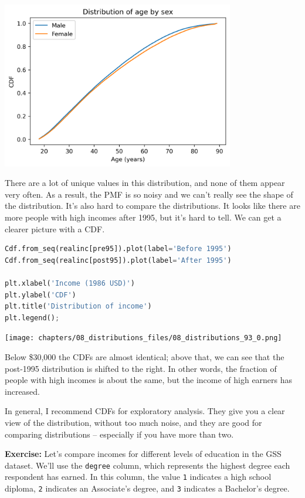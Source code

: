 \begin{center}
\includegraphics[width=4in]{chapters/08_distributions_files/08_distributions_91_0.png}
\end{center}

There are a lot of unique values in this distribution, and none of them
appear very often. As a result, the PMF is so noisy and we can't really
see the shape of the distribution. It's also hard to compare the
distributions. It looks like there are more people with high incomes
after 1995, but it's hard to tell. We can get a clearer picture with a
CDF.

\begin{lstlisting}[language=Python,style=source]
Cdf.from_seq(realinc[pre95]).plot(label='Before 1995')
Cdf.from_seq(realinc[post95]).plot(label='After 1995')

plt.xlabel('Income (1986 USD)')
plt.ylabel('CDF')
plt.title('Distribution of income')
plt.legend();
\end{lstlisting}

\begin{center}
\texttt{[image: chapters/08\_distributions\_files/08\_distributions\_93\_0.png]}
\end{center}

Below \$30,000 the CDFs are almost identical; above that, we can see
that the post-1995 distribution is shifted to the right. In other words,
the fraction of people with high incomes is about the same, but the
income of high earners has increased.

In general, I recommend CDFs for exploratory analysis. They give you a
clear view of the distribution, without too much noise, and they are
good for comparing distributions -- especially if you have more than
two.

\textbf{Exercise:} Let's compare incomes for different levels of
education in the GSS dataset. We'll use the
\passthrough{\lstinline!degree!} column, which represents the highest
degree each respondent has earned. In this column, the value
\passthrough{\lstinline!1!} indicates a high school diploma,
\passthrough{\lstinline!2!} indicates an Associate's degree, and
\passthrough{\lstinline!3!} indicates a Bachelor's degree.


